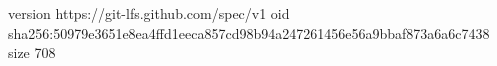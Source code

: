 version https://git-lfs.github.com/spec/v1
oid sha256:50979e3651e8ea4ffd1eeca857cd98b94a247261456e56a9bbaf873a6a6c7438
size 708
